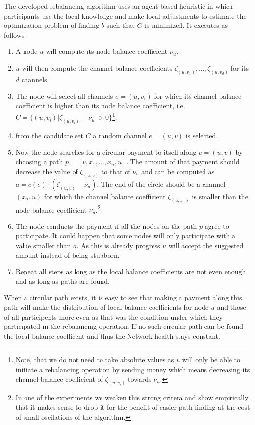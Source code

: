 \documentclass[a4paper]{paper}
\begin{document}
The developed rebalancing algorithm uses an agent-based heuristic in which participants use the local knowledge and make local adjustments to estimate the optimization problem of finding $b$ such that $G$ is minimized.
It executes as follows:
\begin{enumerate}
\item A node $u$ will compute its node balance coefficient $\nu_u$.
\item $u$ will then compute the channel balance coefficients $\zeta_{(u,v_1)},\dots,\zeta_{(u,v_d)}$ for its $d$ channels.
\item The node will select all channels $e=(u,v_i)$ for which its channel balance coefficient is higher 
than its node balance coefficient, i.e.~$C = \{(u,v_i) | \zeta_{(u,v_i)} - \nu_u\ > 0\}$\footnote{
  Note, that we do not need to take absolute values as $u$ will only be able to initiate a rebalancing operation by sending money which means decreasing its channel balance coefficient of $\zeta_{(u,v_i)}$ towards $\nu_u$.}.
\item from the candidate set $C$ a random channel $e=(u,v)$ is selected.
\item Now the node searches for a circular payment to itself along $e=(u,v)$ by choosing a path $p = [v,x_1,\dots,x_n,u]$. The amount of that payment should decrease the value of $\zeta_{(u,v)}$ to that of $\nu_u$ and can be computed as $a = c(e)\cdot (\zeta_{(u,v)}-\nu_u)$. The end of the circle should be a channel $(x_n,u)$ for which the channel balance coefficient $\zeta_{(u,x_n)}$ is smaller than the node balance coefficient $\nu_u$.\footnote{In one of the experiments we weaken this strong critera and show empirically that it makes sense to drop it for the benefit of easier path finding at the cost of small oscilations of the algorithm.}
\item The node conducts the payment if all the nodes on the path $p$ agree to participate. It could happen that some nodes will only participate with a value smaller than $a$. As this is already progress $u$ will accept the suggested amount instead of being stubborn. 
\item Repeat all steps as long as the local balance coefficients are not even enough and as long as paths are found.
\end{enumerate}

When a circular path exists, it is easy to see that making a payment along this path will make the distribution of local balance coefficients for node $u$ and those of all participents more even as that was the condition under which they participated in the rebalancing operation.
If no such circular path can be found the local balance coefficent and thus the Network health stays constant.
\end{document}
